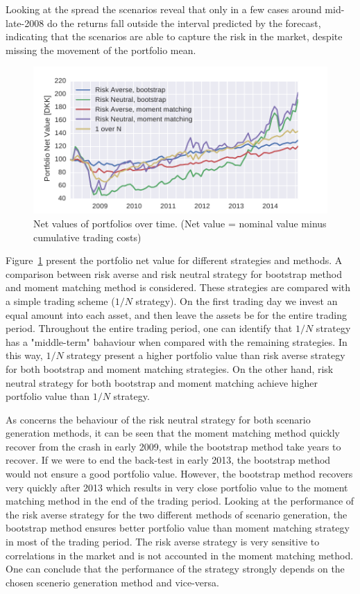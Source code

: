 Looking at the spread the scenarios reveal that only in a few cases around mid-late-2008 do the returns fall outside the interval predicted by the forecast, indicating that the scenarios are able to capture the risk in the market, despite missing the movement of the portfolio mean.

\begin{figure}[tpb]
\centering
\includegraphics{../pic/trading_portfolio_value.pdf}
\caption{Net values of portfolios over time. (Net value = nominal value minus cumulative trading costs)}
\label{fig:tradingportfoliovalues}
\end{figure}

Figure~\ref{fig:tradingportfoliovalues} present the portfolio net value for different strategies and methods. 
A comparison between risk averse and risk neutral strategy for bootstrap method and moment matching method is considered.
These strategies are compared with a simple trading scheme ($1/N$ strategy).
On the first trading day we invest an equal amount into each asset, and then leave the assets be for the entire trading period.
Throughout the entire trading period, one can identify that $1/N$ strategy has a "middle-term" bahaviour when compared with the remaining strategies.
In this way, $1/N$ strategy present a higher portfolio value than risk averse strategy for both bootstrap and moment matching strategies.
On the other hand, risk neutral strategy for both bootstrap and moment matching achieve higher portfolio value than $1/N$ strategy.

As concerns the behaviour of the risk neutral strategy for both scenario generation methods, it can be seen that the moment matching method quickly recover from the crash in early 2009, while the bootstrap method take years to recover.
If we were to end the back-test in early 2013, the bootstrap method would not ensure a good portfolio value.
However, the bootstrap method recovers very quickly after 2013 which results in very close portfolio value to the moment matching method in the end of the trading period.
Looking at the performance of the risk averse strategy for the two different methods of scenario generation, the bootstrap method ensures better portfolio value than moment matching strategy in most of the trading period. The risk averse strategy is very sensitive to correlations in the market and is not accounted in the moment matching method. 
One can conclude that the performance of the strategy strongly depends on the chosen scenerio generation method and vice-versa.

